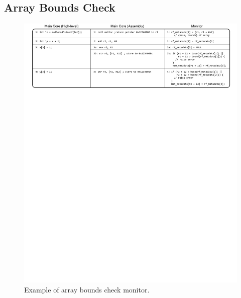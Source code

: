 \subsection{Array Bounds Check}

\begin{figure}
  \begin{center}
    \includegraphics[width=\columnwidth]{figs/code_bc.pdf}
    \caption{Example of array bounds check monitor.}
    \label{fig:monitoring.code_bc}
    \vspace{-0.1in}
  \end{center}
\end{figure} 

